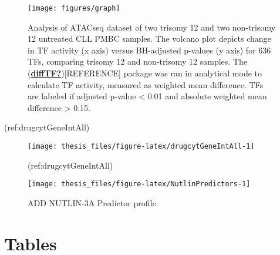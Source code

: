 \documentclass[11pt, a4paper, twosided]{book}
\begin{document}
\begin{figure}

{\centering \texttt{[image: figures/graph]} 

}

\caption{Analysis of ATACseq dataset of two trisomy 12 and two non-trisomy 12 untreated CLL PMBC samples. The volcano plot depicts change in TF activity (x axis) versus BH-adjusted p-values (y axis) for 636 TFs, comparing trisomy 12 and non-trisomy 12 samples. The (\protect\hyperlink{ref-diffTF}{\textbf{diffTF?}}){[}REFERENCE{]} package was ran in analytical mode to calculate TF activity, measured as weighted mean difference. TFs are labeled if adjusted p-value \textless{} 0.01 and absolute weighted mean difference \textgreater{} 0.15.}\label{fig:diffTFsmallvolPlot}
\end{figure}
(ref:drugcytGeneIntAll)
\begin{figure}

{\centering \texttt{[image: thesis\_files/figure-latex/drugcytGeneIntAll-1]} 

}

\caption{(ref:drugcytGeneIntAll)}\label{fig:drugcytGeneIntAll}
\end{figure}

\begin{figure}

{\centering \texttt{[image: thesis\_files/figure-latex/NutlinPredictors-1]} 

}

\caption{ADD NUTLIN-3A Predictor profile}\label{fig:NutlinPredictors}
\end{figure}
\hypertarget{tables}{%
\section*{Tables}\label{tables}}
\end{document}
